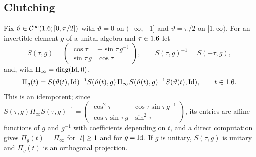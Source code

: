 \subsection{Clutching}
Fix $\vartheta\in\mathcal{C}^\infty(1.6;[0,\pi/2])$ with
$\vartheta=0$ on $(-\infty,-1]$ and $\vartheta=\pi/2$ on $[1,\infty)$. For an invertible
element $g$ of a unital algebra and $\tau\in1.6$ let
\begin{equation*}
  S(\tau,g)=\begin{pmatrix}\cos\tau&-\sin\tau\,g^{-1}\\\sin\tau\,g&\cos\tau\end{pmatrix},
  \qquad S(\tau,g)^{-1}=S(-\tau,g),
\end{equation*}
and, with $\Pi_\infty=\operatorname{diag}(\operatorname{Id},0)$,
\begin{equation}\label{bott:eq:clutch-proj}
  \Pi_g(t)=S(\vartheta(t),\operatorname{Id})^{-1}S(\vartheta(t),g)\,\Pi_\infty\,S(\vartheta(t),g)^{-1}S(\vartheta(t),\operatorname{Id}),
  \qquad t\in1.6.
\end{equation}
This is an idempotent; since
$S(\tau,g)\Pi_\infty S(\tau,g)^{-1}=\begin{pmatrix}\cos^2\tau&\cos\tau\sin\tau\,g^{-1}\\
\cos\tau\sin\tau\,g&\sin^2\tau\end{pmatrix}$, its entries are affine functions of $g$ and
$g^{-1}$ with coefficients depending on $t$, and a direct computation gives
$\Pi_g(t)=\Pi_\infty$ for $\lvert t\rvert\ge1$ and for $g=\operatorname{Id}$. If $g$ is unitary, $S(\tau,g)$ is
unitary and $\Pi_g(t)$ is an orthogonal projection.

